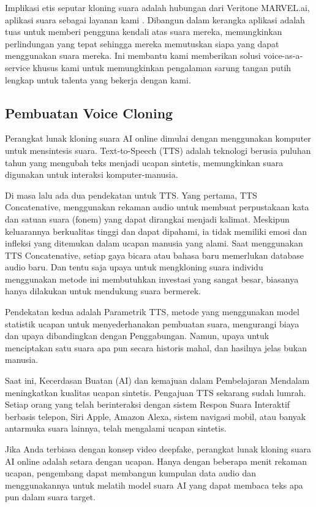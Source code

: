 Implikasi etis seputar kloning suara adalah hubungan dari Veritone MARVEL.ai, aplikasi suara sebagai layanan kami . Dibangun dalam kerangka aplikasi adalah tuas untuk memberi pengguna kendali atas suara mereka, memungkinkan perlindungan yang tepat sehingga mereka memutuskan siapa yang dapat menggunakan suara mereka. Ini membantu kami memberikan solusi voice-as-a-service khusus kami untuk memungkinkan pengalaman sarung tangan putih lengkap untuk talenta yang bekerja dengan kami.

\subsection{Pembuatan Voice Cloning}
Perangkat lunak kloning suara AI online dimulai dengan menggunakan komputer untuk mensintesis suara. Text-to-Speech (TTS) adalah teknologi berusia puluhan tahun yang mengubah teks menjadi ucapan sintetis, memungkinkan suara digunakan untuk interaksi komputer-manusia.

Di masa lalu ada dua pendekatan untuk TTS. Yang pertama, TTS Concatenative\cite{Hunt1996UnitSI}, menggunakan rekaman audio untuk membuat perpustakaan kata dan satuan suara (fonem) yang dapat dirangkai menjadi kalimat. Meskipun keluarannya berkualitas tinggi dan dapat dipahami, ia tidak memiliki emosi dan infleksi yang ditemukan dalam ucapan manusia yang alami. Saat menggunakan TTS Concatenative, setiap gaya bicara atau bahasa baru memerlukan database audio baru. Dan tentu saja upaya untuk mengkloning suara individu menggunakan metode ini membutuhkan investasi yang sangat besar, biasanya hanya dilakukan untuk mendukung suara bermerek.

Pendekatan kedua adalah Parametrik TTS\cite{ZEN20091039}, metode yang menggunakan model statistik ucapan untuk menyederhanakan pembuatan suara, mengurangi biaya dan upaya dibandingkan dengan Penggabungan. Namun, upaya untuk menciptakan satu suara apa pun secara historis mahal, dan hasilnya jelas bukan manusia.

Saat ini, Kecerdasan Buatan (AI) dan kemajuan dalam Pembelajaran Mendalam meningkatkan kualitas ucapan sintetis. Pengajuan TTS sekarang sudah lumrah. Setiap orang yang telah berinteraksi dengan sistem Respon Suara Interaktif berbasis telepon, Siri Apple, Amazon Alexa, sistem navigasi mobil, atau banyak antarmuka suara lainnya, telah mengalami ucapan sintetis.

Jika Anda terbiasa dengan konsep video deepfake, perangkat lunak kloning suara AI online adalah setara dengan ucapan. Hanya dengan beberapa menit rekaman ucapan, pengembang dapat membangun kumpulan data audio dan menggunakannya untuk melatih model suara AI yang dapat membaca teks apa pun dalam suara target.

